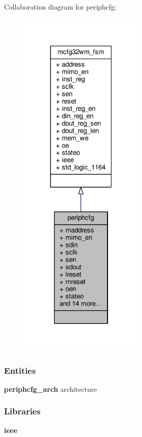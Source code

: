 Collaboration diagram for periphcfg\+:\nopagebreak
\begin{figure}[H]
\begin{center}
\leavevmode
\includegraphics[width=171pt]{df/d42/classperiphcfg__coll__graph}
\end{center}
\end{figure}
\subsubsection*{Entities}
\begin{DoxyCompactItemize}
\item 
{\bf periphcfg\+\_\+arch} architecture
\end{DoxyCompactItemize}
\subsubsection*{Libraries}
 \begin{DoxyCompactItemize}
\item 
{\bf ieee} 
\end{DoxyCompactItemize}
